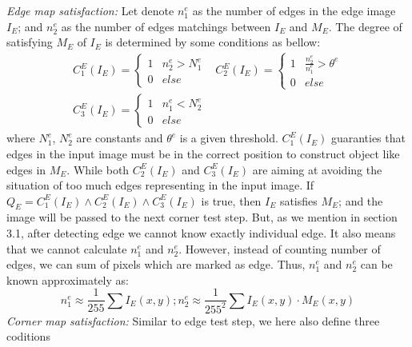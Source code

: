 \textit{Edge map satisfaction:} Let denote $n_{1}^{e}$ as the number of edges in the edge image $I_E$; and $n_{2}^{e}$ as the number of edges matchings between $I_E$ and $M_E$.
The degree of satisfying $M_E$ of $I_E$ is determined by some conditions as
bellow:
\begin{equation}
 \begin{array}{rcl}
   C_1^E(I_E) = \left\{ 
   \begin{array}{rcl}
   1 &  n_2^e > N_1^e \\
   0 &  else
   \end{array}\right. &
   C_2^E(I_E) = \left\{ 
    \begin{array}{rcl}
    1 &  \frac{n_2^e}{n_1^e} > \theta^e \\
    0 & else
    \end{array}\right. \\  
   C_3^E(I_E) = \left\{ 
   \begin{array}{rcl}
   1 & n_1^e < N_2^e \\
   0 & else
   \end{array}\right. &
   \mbox{~~~~~}
 \end{array}
  \label{eq:edge_map_satisfy}
\end{equation}
where $N_1^e$, $N_2^e$ are constants and $\theta^e$ is a given threshold.
$C_1^E(I_E)$ guaranties that edges in the input image must be in the correct
position to construct object like edges in $M_E$. While both $C_2^E(I_E)$ and $C_3^E(I_E)$
are aiming at avoiding the situation of too much edges representing in the input image. If $Q_E = C_1^E(I_E) \wedge C_2^E(I_E) \wedge C_3^E(I_E)$ is true, then $I_E$ satisfies $M_E$; and the image will be passed to the next corner test step.
But, as we mention in section 3.1, after detecting edge we cannot
know exactly individual edge. It also means that we cannot calculate $n_1^e$ and $n_2^e$. However, instead of counting number of edges, we can sum of pixels which are marked as edge. Thus, $n_1^e$ and $n_2^e$ can be known approximately as:
\begin{equation}
 n_1^e \approx \frac{1}{255} \sum I_E(x,y);
 \mbox{}
 n_2^e \approx \frac{1}{255^2} \sum I_E(x,y)\cdot M_E(x,y)
   \label{eq:n_1_e_and_n_2_e}
\end{equation}
\textit{Corner map satisfaction:} 
Similar to edge test step, we here also define three coditions
